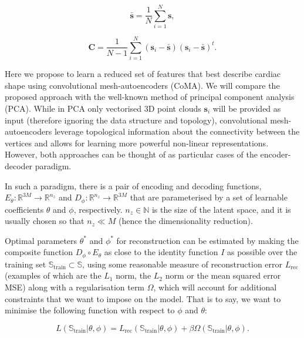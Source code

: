 \begin{equation}
\bar{\textbf{s}}=\frac{1}{N}\sum_{i=1}^{N}{\textbf{s}},
\end{equation}

\begin{equation}
\textbf{C}=\frac{1}{N-1}\sum_{i=1}^{N}({\textbf{s}}_i-\bar{\textbf{s}})({\textbf{s}}_i-\bar{\textbf{s}})^t.
\end{equation}

Here we propose to learn a reduced set of features that best describe cardiac shape using convolutional mesh-autoencoders (CoMA). We will compare the proposed approach with the well-known method of principal component analysis (PCA). While in PCA only vectorised 3D point clouds $\textbf{s}_i$ will be provided as input (therefore ignoring the data structure and topology), convolutional mesh-autoencoders leverage topological information about the connectivity between the vertices and allows for learning more powerful non-linear representations. However, both approaches can be thought of as particular cases of the encoder-decoder paradigm.

In such a paradigm, there is a pair of encoding and decoding functions, $E_{\theta}:\mathbb{R}^{3M}\rightarrow\mathbb{R}^{n_z}$ and $D_{\phi}:\mathbb{R}^{n_z}\rightarrow\mathbb{R}^{3M}$ that are parameterised by a set of learnable coefficients $\theta$ and $\phi$, respectively. $n_z\in\mathbb{N}$ is the size of the latent space, and it is usually chosen so that $n_z\ll M$ (hence the dimensionality reduction). 

Optimal parameters $\theta^*$ and $\phi^*$ for reconstruction can be estimated by making the composite function $D_{\phi} \circ E_{\theta}$ as close to the identity function $I$ as possible over the training set $\mathbb{S}_\text{train}\subset\mathbb{S}$, using some reasonable measure of reconstruction error $L_{\text{rec}}$ (examples of which are the $L_1$ norm, the $L_2$ norm or the mean squared error MSE) along with a regularisation term $\Omega$, which will account for additional constraints that we want to impose on the model. That is to say, we want to minimise the following function with respect to $\phi$ and $\theta$: 

\begin{equation}
L(\mathbb{S}_\text{train}|\theta, \phi)=
L_{\text{rec}}(\mathbb{S}_\text{train}|\theta, \phi)+
\beta\Omega(\mathbb{S}_\text{train}|\theta, \phi).
\label{eq_loss_function}
\end{equation}

